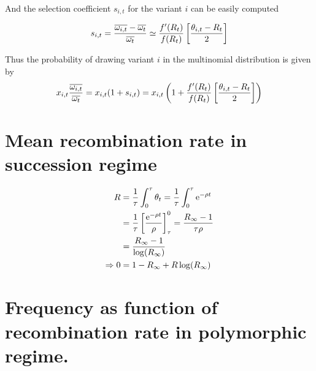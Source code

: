 \documentclass{article}
\begin{document}
And the selection coefficient $s_{i,t}$ for the variant $i$ can be easily computed

\begin{equation}
    s_{i,t} = \dfrac{\overline{\omega_{i,t}} - \overline{\omega_{t}}}{\overline{\omega_{t}}}
    \simeq  \dfrac{f'(R_{t} )}{f(R_{t} )} \left[ \dfrac{\theta _{i,t} - R_{t} }{2} \right]
\end{equation}

Thus the probability of drawing variant $i$ in the multinomial distribution is given by 
\begin{equation}
    x_{i,t} \dfrac{\overline{\omega_{i,t}}}{\overline{\omega_{t}}} = 
     x_{i,t} (1 + s_{i,t}) =  x_{i,t} \left(1 +  \dfrac{f'(R_{t} )}{f(R_{t} )} \left[ \dfrac{\theta _{i,t} - R_{t} }{2} \right] \right)
\end{equation}

\section*{Mean recombination rate in succession regime}

\begin{align} 
    R &=  \dfrac{1}{\tau}\int_0^{\tau} \theta_{t} 
        	 = \dfrac{1}{\tau}\int_0^{\tau} \operatorname{e}^{-\rho t} \\
        	 &= \dfrac{1}{\tau} \left[  \dfrac{\operatorname{e}^{-\rho t}}{\rho }  \right]_{\tau}^{0}
        	 = \dfrac{{R_{\infty}} - 1}{\tau \rho}\\
        	 &= \dfrac{{R_{\infty}} - 1}{\operatorname{log}({R_{\infty}} )} \\
    \Rightarrow 0 &=  1-{R_{\infty}}  + R  \operatorname{log}({R_{\infty}} ) 
\end{align}

\section*{Frequency as function of recombination rate in polymorphic regime.}
\end{document}
